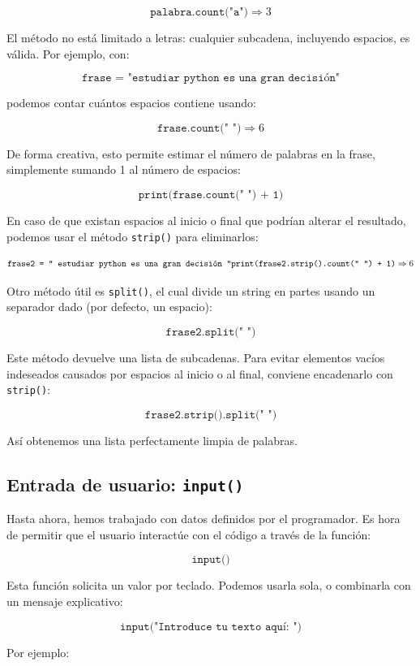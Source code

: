 \documentclass{article}
\theoremstyle{nonumberplain}
\begin{document}
\[
\texttt{palabra.count("a")} \Rightarrow 3
\]

El método no está limitado a letras: cualquier subcadena, incluyendo espacios, es válida. Por ejemplo, con:

\[
\texttt{frase = "estudiar python es una gran decisión"}
\]

podemos contar cuántos espacios contiene usando:

\[
\texttt{frase.count(" ")} \Rightarrow 6
\]

De forma creativa, esto permite estimar el número de palabras en la frase, simplemente sumando 1 al número de espacios:

\[
\texttt{print(frase.count(" ") + 1)}
\]

En caso de que existan espacios al inicio o final que podrían alterar el resultado, podemos usar el método \texttt{strip()} para eliminarlos:

\[
\texttt{frase2 = " estudiar python es una gran decisión "} \\
\texttt{print(frase2.strip().count(" ") + 1)} \Rightarrow 6
\]

Otro método útil es \texttt{split()}, el cual divide un string en partes usando un separador dado (por defecto, un espacio):

\[
\texttt{frase2.split(" ")}
\]

Este método devuelve una lista de subcadenas. Para evitar elementos vacíos indeseados causados por espacios al inicio o al final, conviene encadenarlo con \texttt{strip()}:

\[
\texttt{frase2.strip().split(" ")}
\]

Así obtenemos una lista perfectamente limpia de palabras.



\subsection*{Entrada de usuario: \texttt{input()}}

Hasta ahora, hemos trabajado con datos definidos por el programador. Es hora de permitir que el usuario interactúe con el código a través de la función:

\[
\texttt{input()}
\]

Esta función solicita un valor por teclado. Podemos usarla sola, o combinarla con un mensaje explicativo:

\[
\texttt{input("Introduce tu texto aquí: ")}
\]

Por ejemplo:
\end{document}
